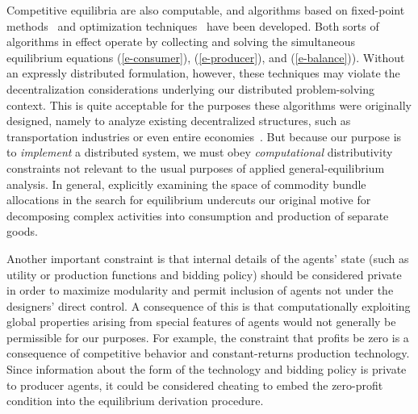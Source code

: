 Competitive equilibria are also computable, and algorithms based on fixed-point 
methods~\cite{Scarf84a} and optimization techniques~\cite{Nagurney93}
have been developed.
Both sorts of algorithms in effect operate by collecting and solving the
simultaneous equilibrium equations (\ref{e-consumer}), (\ref{e-producer}),
and (\ref{e-balance})).
Without an expressly distributed formulation, however, these techniques 
may violate the decentralization considerations underlying our distributed
problem-solving context.
This is quite acceptable for the purposes these algorithms were 
originally designed, namely to analyze existing decentralized structures, such
as transportation industries or even entire economies~\cite{Shoven92}.
But because our purpose is to {\em implement\/} a distributed system, we must 
obey {\em computational\/} distributivity constraints not relevant to the usual
purposes of applied general-equilibrium analysis.
In general, explicitly examining the space of commodity bundle 
allocations in the search for equilibrium undercuts our original motive for 
decomposing complex activities into consumption and production of separate goods.

Another important constraint is that internal details of the agents' state
(such as utility or production functions and bidding policy) should be
considered private in order to maximize modularity and permit inclusion of
agents not under the designers' direct control.
A consequence of this is that computationally exploiting global properties
arising from special features of agents would not 
generally be permissible for our purposes.
For example, the constraint that profits be zero is a consequence of 
competitive behavior and constant-returns production technology.
Since information about the form of the technology and bidding policy is
private to producer agents, it could be considered cheating to
embed the zero-profit 
condition into the equilibrium derivation procedure.

